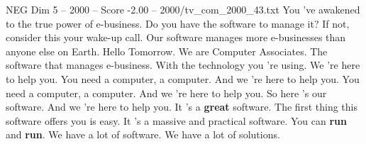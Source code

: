 \begin{textsample}{NEG Dim 5 – 2000 – Score -2.00 – 2000/tv\_com\_2000\_43.txt}  \label{ex:f5_neg_031}
You 've awakened to the true power of e-business.
Do you have the software to manage it?
If not, consider this your wake-up call.
Our software manages more e-businesses than anyone else on Earth.
Hello Tomorrow.
We are Computer Associates.
The software that manages e-business.
With the technology you 're using.
We 're here to help you.
You need a computer, a computer.
And we 're here to help you.
You need a computer, a computer.
And we 're here to help you.
So here 's our software.
And we 're here to help you.
It 's a \textbf{great} software.
The first thing this software offers you is easy.
It 's a massive and practical software.
You can \textbf{run} and \textbf{run}.
We have a lot of software.
We have a lot of solutions.

\end{textsample}
